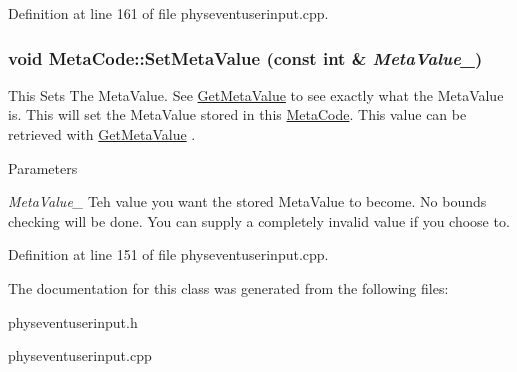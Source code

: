 Definition at line 161 of file physeventuserinput.cpp.\hypertarget{classMetaCode_a1e410df95815b4d7e94b971bb1b8ba1e}{
\subsubsection[{SetMetaValue}]{\setlength{\rightskip}{0pt plus 5cm}void MetaCode::SetMetaValue (const int \& {\em MetaValue\_\-})}}
\label{d7/d72/classMetaCode_a1e410df95815b4d7e94b971bb1b8ba1e}


This Sets The MetaValue. See \hyperlink{classMetaCode_a8d9cd9709ab51323d7061cf7b0ea4ee2}{GetMetaValue} to see exactly what the MetaValue is. This will set the MetaValue stored in this \hyperlink{classMetaCode}{MetaCode}. This value can be retrieved with \hyperlink{classMetaCode_a8d9cd9709ab51323d7061cf7b0ea4ee2}{GetMetaValue} . 
\begin{DoxyParams}{Parameters}
\item[{\em MetaValue\_\-}]Teh value you want the stored MetaValue to become. No bounds checking will be done. You can supply a completely invalid value if you choose to. \end{DoxyParams}


Definition at line 151 of file physeventuserinput.cpp.

The documentation for this class was generated from the following files:\begin{DoxyCompactItemize}
\item 
physeventuserinput.h\item 
physeventuserinput.cpp\end{DoxyCompactItemize}
